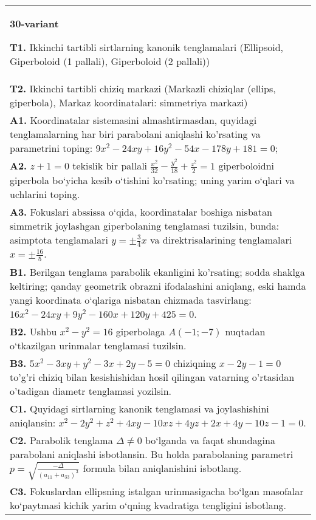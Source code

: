 \documentclass{article}
\begin{document}
\begin{tabular}{m{17cm}}
\textbf{30-variant}
\newline

\textbf{T1.} Ikkinchi tartibli sirtlarning kanonik tenglamalari (Ellipsoid, Giperboloid (1 pallali), Giperboloid (2 pallali)) \\
\textbf{T2.} Ikkinchi tartibli chiziq markazi (Markazli chiziqlar (ellips, giperbola), Markaz koordinatalari: simmetriya markazi) \\
\textbf{A1.} Koordinatalar sistemasini almashtirmasdan, quyidagi tenglamalarning har biri parabolani aniqlashi ko'rsating va parametrini toping: $9 x^2-24 x y+16 y^2-54 x-178 y+181=0$; \\
\textbf{A2.} $z+1=0$ tekislik bir pallali $\frac{x^2}{32}-\frac{y^2}{18}+\frac{z^2}{2}=1$ giperboloidni giperbola bo‘yicha kesib o‘tishini ko'rsating; uning yarim o‘qlari va uchlarini toping. \\
\textbf{A3.} Fokuslari abssissa o‘qida, koordinatalar boshiga nisbatan simmetrik joylashgan giperbolaning tenglamasi tuzilsin, bunda: asimptota tenglamalari $y= \pm \frac{3}{4} x$ va direktrisalarining tenglamalari $x= \pm \frac{16}{5}$. \\
\textbf{B1.} Berilgan tenglama parabolik ekanligini ko'rsating; sodda shaklga keltiring; qanday geometrik obrazni ifodalashini aniqlang, eski hamda yangi koordinata o‘qlariga nisbatan chizmada tasvirlang: $16 x^2-24 x y+9 y^2-160 x+120 y+425=0$. \\
\textbf{B2.} Ushbu $x^2-y^2=16$ giperbolaga $A (-1;-7)$ nuqtadan o‘tkazilgan urinmalar tenglamasi tuzilsin. \\
\textbf{B3.} $5 x^2-3 x y+y^2-3 x+2 y-5=0$ chiziqning $x-2 y-1=0$ to'g'ri chiziq bilan kesishishidan hosil qilingan vatarning o'rtasidan o'tadigan diametr tenglamasi yozilsin. \\
\textbf{C1.} Quyidagi sirtlarning kanonik tenglamasi va joylashishini aniqlansin: $x^2-2 y^2+z^2+4 x y-10 x z+4 y z+2 x+4 y-10 z-1=0$. \\
\textbf{C2.} Parabolik tenglama $\Delta \neq 0$ bo‘lganda va faqat shundagina parabolani aniqlashi isbotlansin. Bu holda parabolaning parametri $p=\sqrt{\frac{-\Delta}{ (a_{11}+a_{33}) ^3}}$ formula bilan aniqlanishini isbotlang. \\
\textbf{C3.} Fokuslardan ellipsning istalgan urinmasigacha bo‘lgan masofalar ko‘paytmasi kichik yarim o‘qning kvadratiga tengligini isbotlang. \\

\end{tabular}
\vspace{1cm}
\end{document}
